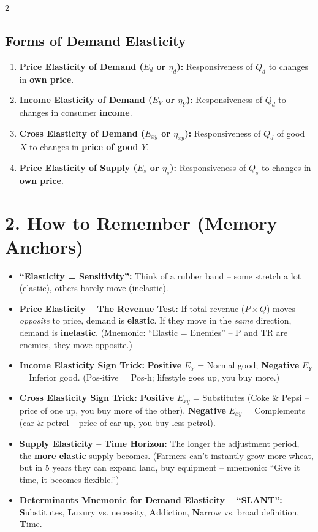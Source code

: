 \documentclass[10pt,a4paper]{article}
\begin{document}
\begin{multicols}{2}
\subsection*{Forms of Demand Elasticity}
\begin{enumerate}[leftmargin=*,nosep]
    \item \textbf{Price Elasticity of Demand ($E_d$ or $\eta_d$):} Responsiveness of $Q_d$ to changes in \textbf{own price}.
    \item \textbf{Income Elasticity of Demand ($E_Y$ or $\eta_Y$):} Responsiveness of $Q_d$ to changes in consumer \textbf{income}.
    \item \textbf{Cross Elasticity of Demand ($E_{xy}$ or $\eta_{xy}$):} Responsiveness of $Q_d$ of good $X$ to changes in \textbf{price of good $Y$}.
    \item \textbf{Price Elasticity of Supply ($E_s$ or $\eta_s$):} Responsiveness of $Q_s$ to changes in \textbf{own price}.
\end{enumerate}

\section*{2. How to Remember (Memory Anchors)}
\begin{itemize}[leftmargin=*,nosep]
    \item \textbf{``Elasticity = Sensitivity'':} Think of a rubber band -- some stretch a lot (elastic), others barely move (inelastic).
    \item \textbf{Price Elasticity -- The Revenue Test:} If total revenue ($P \times Q$) moves \textit{opposite} to price, demand is \textbf{elastic}. If they move in the \textit{same} direction, demand is \textbf{inelastic}. (Mnemonic: ``Elastic = Enemies'' -- P and TR are enemies, they move opposite.)
    \item \textbf{Income Elasticity Sign Trick:} \textbf{Positive} $E_Y$ = Normal good; \textbf{Negative} $E_Y$ = Inferior good. (Pos-itive = Pos-h; lifestyle goes up, you buy more.)
    \item \textbf{Cross Elasticity Sign Trick:} \textbf{Positive} $E_{xy}$ = Substitutes (Coke \& Pepsi -- price of one up, you buy more of the other). \textbf{Negative} $E_{xy}$ = Complements (car \& petrol -- price of car up, you buy less petrol).
    \item \textbf{Supply Elasticity -- Time Horizon:} The longer the adjustment period, the \textbf{more elastic} supply becomes. (Farmers can't instantly grow more wheat, but in 5 years they can expand land, buy equipment -- mnemonic: ``Give it time, it becomes flexible.'')
    \item \textbf{Determinants Mnemonic for Demand Elasticity -- ``SLANT'':} \textbf{S}ubstitutes, \textbf{L}uxury vs. necessity, \textbf{A}ddiction, \textbf{N}arrow vs. broad definition, \textbf{T}ime.
\end{itemize}


\end{multicols}
\end{document}
